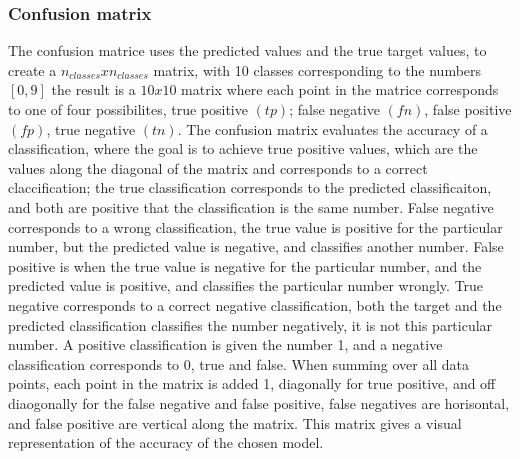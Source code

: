 \subsubsection{Confusion matrix}
The confusion matrice uses the predicted values and the true target values,
to create a $n_{classes} x n_{classes}$ matrix, with 10 classes corresponding to the numbers $[0,9]$
the result is a $10 x 10$ matrix where each point in the matrice corresponds to one of four possibilites,
true positive $(tp)$; false negative $(fn)$, false positive $(fp)$, true negative $(tn)$. The confusion matrix
evaluates the accuracy of a classification, where the goal is to achieve true positive values, which are
the values along the diagonal of the matrix and corresponds to a correct claccification; the true classification
corresponds to the predicted classificaiton, and both are positive that the classification is the same number. 
False negative corresponds to a wrong classification, the true value is positive for the particular number,
but the predicted value is negative, and classifies another number. False positive is when the 
true value is negative for the particular number, and the predicted value is positive, and classifies the
particular number wrongly. True negative corresponds to a correct negative classification,
both the target and the predicted classification classifies the number negatively, it is not this particular number.
A positive classification is given the number 1, and a negative classification corresponds to 0, true and false. 
When summing over all data points, each point in the matrix is added 1, diagonally for true positive,
and off diaogonally for the false negative and false positive, false negatives are horisontal, and false positive are vertical along the matrix.
This matrix gives a visual representation of the accuracy of the chosen model. \cite{Confusion_matrix}
